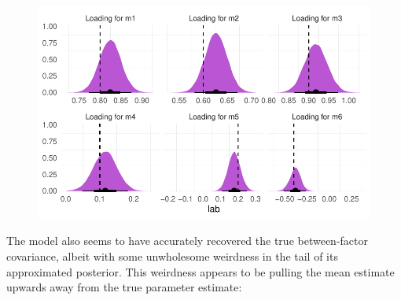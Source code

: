 \documentclass[
  letterpaper,
  DIV=11,
  numbers=noendperiod]{scrreprt}
\begin{document}
\begin{figure}[H]

{\centering \includegraphics{./bayesian-cfa_files/figure-pdf/viz-loadings-2-fac-1.pdf}

}

\end{figure}

The model also seems to have accurately recovered the true
between-factor covariance, albeit with some unwholesome weirdness in the
tail of its approximated posterior. This weirdness appears to be pulling
the mean estimate upwards away from the true parameter estimate:
\end{document}
